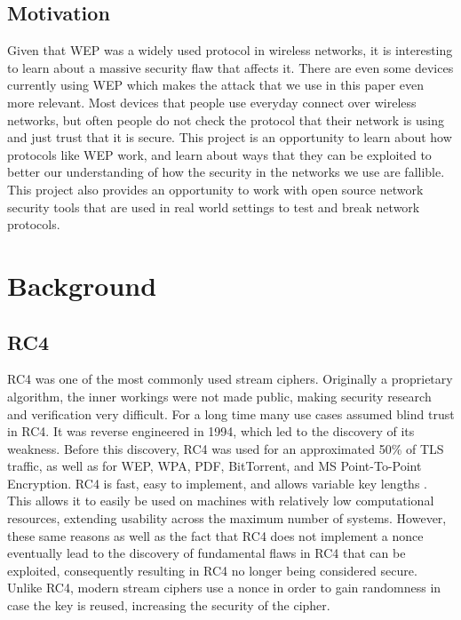 \documentclass[10pt, titlepage]{article}
\begin{document}
\subsection{Motivation}
Given that WEP was a widely used protocol in wireless networks, it is interesting to learn about a massive security flaw that affects it. There are even some devices currently using WEP which makes the attack that we use in this paper even more relevant. Most devices that people use everyday connect over wireless networks, but often people do not check the protocol that their network is using and just trust that it is secure. This project is an opportunity to learn about how protocols like WEP work, and learn about ways that they can be exploited to better our understanding of how the security in the networks we use are fallible. This project also provides an opportunity to work with open source network security tools that are used in real world settings to test and break network protocols.




\section{Background}
\subsection{RC4}
RC4 was one of the most commonly used stream ciphers. Originally a proprietary algorithm, the inner workings were not made public, making security research and verification very difficult. For a long time many use cases assumed blind trust in RC4. It was reverse engineered in 1994, which led to the discovery of its weakness. Before this discovery, RC4 was used for an approximated 50\% of TLS traffic, as well as for WEP, WPA, PDF, BitTorrent, and MS Point-To-Point Encryption. RC4 is fast, easy to implement, and allows variable key lengths \cite{appliedCrypto}. This allows it to easily be used on machines with relatively low computational resources, extending usability across the maximum number of systems. However, these same reasons as well as the fact that RC4 does not implement a nonce eventually lead to the discovery of fundamental flaws in RC4 that can be exploited, consequently resulting in RC4 no longer being considered secure. Unlike RC4, modern stream ciphers use a nonce in order to gain randomness in case the key is reused, increasing the security of the cipher.
\end{document}
